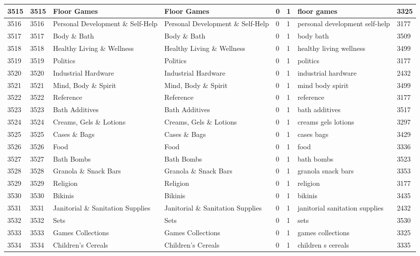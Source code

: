 \begin{longtable}{|l|l|l|l|l|l|l|l|}
3515 & 3515 & Floor Games & Floor Games & 0 & 1 & floor games & 3325 \\ \hline 
3516 & 3516 & Personal Development \& Self-Help & Personal Development \& Self-Help & 0 & 1 & personal development self-help & 3177 \\ \hline 
3517 & 3517 & Body \& Bath & Body \& Bath & 0 & 1 & body bath & 3509 \\ \hline 
3518 & 3518 & Healthy Living \& Wellness & Healthy Living \& Wellness & 0 & 1 & healthy living wellness & 3499 \\ \hline 
3519 & 3519 & Politics & Politics & 0 & 1 & politics & 3177 \\ \hline 
3520 & 3520 & Industrial Hardware & Industrial Hardware & 0 & 1 & industrial hardware & 2432 \\ \hline 
3521 & 3521 & Mind, Body \& Spirit & Mind, Body \& Spirit & 0 & 1 & mind body spirit & 3499 \\ \hline 
3522 & 3522 & Reference & Reference & 0 & 1 & reference & 3177 \\ \hline 
3523 & 3523 & Bath Additives & Bath Additives & 0 & 1 & bath additives & 3517 \\ \hline 
3524 & 3524 & Creams, Gels \& Lotions & Creams, Gels \& Lotions & 0 & 1 & creams gels lotions & 3297 \\ \hline 
3525 & 3525 & Cases \& Bags & Cases \& Bags & 0 & 1 & cases bags & 3429 \\ \hline 
3526 & 3526 & Food & Food & 0 & 1 & food & 3336 \\ \hline 
3527 & 3527 & Bath Bombs & Bath Bombs & 0 & 1 & bath bombs & 3523 \\ \hline 
3528 & 3528 & Granola \& Snack Bars & Granola \& Snack Bars & 0 & 1 & granola snack bars & 3353 \\ \hline 
3529 & 3529 & Religion & Religion & 0 & 1 & religion & 3177 \\ \hline 
3530 & 3530 & Bikinis & Bikinis & 0 & 1 & bikinis & 3435 \\ \hline 
3531 & 3531 & Janitorial \& Sanitation Supplies & Janitorial \& Sanitation Supplies & 0 & 1 & janitorial sanitation supplies & 2432 \\ \hline 
3532 & 3532 & Sets & Sets & 0 & 1 & sets & 3530 \\ \hline 
3533 & 3533 & Games Collections & Games Collections & 0 & 1 & games collections & 3325 \\ \hline 
3534 & 3534 & Children's Cereals & Children's Cereals & 0 & 1 & children s cereals & 3335 \\ \hline 

\end{longtable}
